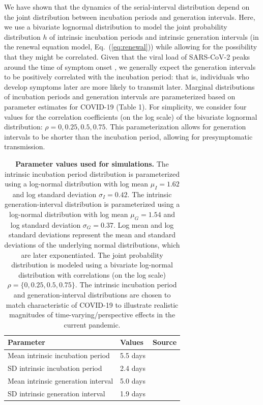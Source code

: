 \documentclass[12pt]{article}
\newcommand{\eref}[1]{Eq.~(\ref{eq:#1})}
\begin{document}
We have shown that the dynamics of the serial-interval distribution depend on the joint distribution between incubation periods and generation intervals.
Here, we use a bivariate lognormal distribution to model the joint probability distribution $h$ of intrinsic incubation periods and intrinsic generation intervals (in the renewal equation model, \eref{renewal}) while allowing for the possibility that they might be correlated.
Given that the viral load of SARS-CoV-2 peaks around the time of symptom onset \citep{he2020temporal}, we generally expect the generation intervals to be positively correlated with the incubation period:
that is, individuals who develop symptoms later are more likely to transmit later.
Marginal distributions of incubation periods and generation intervals are parameterized based on parameter estimates for COVID-19 (Table 1).
For simplicity, we consider four values for the correlation coefficients (on the log scale) of the bivariate lognormal distribution: $\rho = 0, 0.25, 0.5, 0.75$.
This parameterization allows for generation intervals to be shorter than the incubation period, allowing for presymptomatic transmission.

\begin{table}[!ht]
\begin{center}
\begin{tabular}{|l|l|r|}
\hline
Parameter & Values & Source\\
\hline
Mean intrinsic incubation period & 5.5 days & \cite{lauer2020incubation} \\
SD intrinsic incubation period & 2.4 days & \cite{lauer2020incubation} \\
Mean intrinsic generation interval & 5.0 days & \cite{ferretti2020quantifying} \\
SD intrinsic generation interval & 1.9 days & \cite{ferretti2020quantifying} \\
\hline
\end{tabular}
\end{center}
\caption{
  \textbf{Parameter values used for simulations.}
The intrinsic incubation period distribution is parameterized using a log-normal distribution with log mean $\mu_I=1.62$ and log standard deviation $\sigma_I=0.42$.
The intrinsic generation-interval distribution is parameterized using a log-normal distribution with log mean $\mu_G=1.54$ and log standard deviation $\sigma_G=0.37$.
Log mean and log standard deviations represent the mean and standard deviations of the underlying normal distributions, which are later exponentiated.
The joint probability distribution is modeled using a bivariate log-normal distribution with correlations (on the log scale) $\rho=\{0, 0.25, 0.5, 0.75\}$.
The intrinsic  incubation period and generation-interval distributions are chosen to match characteristic of COVID-19 to illustrate realistic magnitudes of time-varying/perspective effects in the current pandemic.
}
\end{table}
\end{document}
